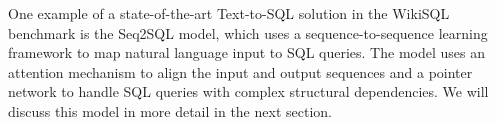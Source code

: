 One example of a state-of-the-art Text-to-SQL solution in the WikiSQL benchmark is the Seq2SQL model, which uses a sequence-to-sequence learning framework to map natural language input to SQL queries. The model uses an attention mechanism to align the input and output sequences and a pointer network to handle SQL queries with complex structural dependencies. We will discuss this model in more detail in the next section.